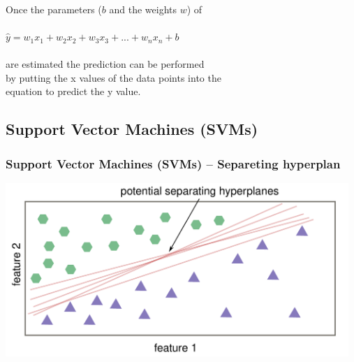\documentclass[aspectratio=169]{beamer}
\begin{document}
\begin{frame}
  \frametitle{}
  \begin{block}{}
    \begin{center}
      Once the parameters ($b$ and the weights $w$) of\\
      \ \\
      $\hat{y} = w_{1}x_{1} + w_{2}x_{2} + w_{3}x_{3} + ... + w_{n}x_{n} + b$\\
      \ \\
      are estimated the prediction can be performed\\
      by putting the x values of the data points into the\\
      equation to predict the y value.
    \end{center}
  \end{block}
\end{frame}

\subsection{Support Vector Machines (SVMs)}

\setcounter{tocdepth}{2}
\begin{frame}{}
   \tableofcontents[currentsubsection]
\end{frame}


\begin{frame}
  \frametitle{Support Vector Machines (SVMs) -- Separeting hyperplan}
  \begin{center}
    \includegraphics[width=13.0cm]{images/svm_potential_separating_hyperplanes.pdf}
  \end{center}
\end{frame}
\end{document}
